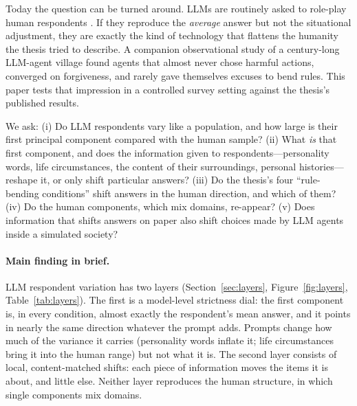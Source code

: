 \documentclass[11pt]{article}
\begin{document}
Today the question can be turned around. LLMs are routinely asked to role-play human respondents \citep{argyle2023out,horton2023homo,aher2023using}. If they reproduce the \emph{average} answer but not the situational adjustment, they are exactly the kind of technology that flattens the humanity the thesis tried to describe. A companion observational study of a century-long LLM-agent village \citep{tanohata2026village} found agents that almost never chose harmful actions, converged on forgiveness, and rarely gave themselves excuses to bend rules. This paper tests that impression in a controlled survey setting against the thesis's published results.

We ask: (i) Do LLM respondents vary like a population, and how large is their first principal component compared with the human sample? (ii) What \emph{is} that first component, and does the information given to respondents---personality words, life circumstances, the content of their surroundings, personal histories---reshape it, or only shift particular answers? (iii) Do the thesis's four ``rule-bending conditions'' shift answers in the human direction, and which of them? (iv) Do the human components, which mix domains, re-appear? (v) Does information that shifts answers on paper also shift choices made by LLM agents inside a simulated society?

\paragraph{Main finding in brief.}
LLM respondent variation has two layers (Section~\ref{sec:layers}, Figure~\ref{fig:layers}, Table~\ref{tab:layers}). The first is a model-level strictness dial: the first component is, in every condition, almost exactly the respondent's mean answer, and it points in nearly the same direction whatever the prompt adds. Prompts change how much of the variance it carries (personality words inflate it; life circumstances bring it into the human range) but not what it is. The second layer consists of local, content-matched shifts: each piece of information moves the items it is about, and little else. Neither layer reproduces the human structure, in which single components mix domains.
\end{document}
